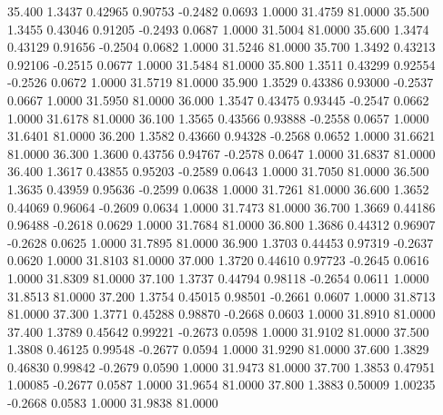   35.400   1.3437   0.42965   0.90753  -0.2482   0.0693   1.0000  31.4759  81.0000
  35.500   1.3455   0.43046   0.91205  -0.2493   0.0687   1.0000  31.5004  81.0000
  35.600   1.3474   0.43129   0.91656  -0.2504   0.0682   1.0000  31.5246  81.0000
  35.700   1.3492   0.43213   0.92106  -0.2515   0.0677   1.0000  31.5484  81.0000
  35.800   1.3511   0.43299   0.92554  -0.2526   0.0672   1.0000  31.5719  81.0000
  35.900   1.3529   0.43386   0.93000  -0.2537   0.0667   1.0000  31.5950  81.0000
  36.000   1.3547   0.43475   0.93445  -0.2547   0.0662   1.0000  31.6178  81.0000
  36.100   1.3565   0.43566   0.93888  -0.2558   0.0657   1.0000  31.6401  81.0000
  36.200   1.3582   0.43660   0.94328  -0.2568   0.0652   1.0000  31.6621  81.0000
  36.300   1.3600   0.43756   0.94767  -0.2578   0.0647   1.0000  31.6837  81.0000
  36.400   1.3617   0.43855   0.95203  -0.2589   0.0643   1.0000  31.7050  81.0000
  36.500   1.3635   0.43959   0.95636  -0.2599   0.0638   1.0000  31.7261  81.0000
  36.600   1.3652   0.44069   0.96064  -0.2609   0.0634   1.0000  31.7473  81.0000
  36.700   1.3669   0.44186   0.96488  -0.2618   0.0629   1.0000  31.7684  81.0000
  36.800   1.3686   0.44312   0.96907  -0.2628   0.0625   1.0000  31.7895  81.0000
  36.900   1.3703   0.44453   0.97319  -0.2637   0.0620   1.0000  31.8103  81.0000
  37.000   1.3720   0.44610   0.97723  -0.2645   0.0616   1.0000  31.8309  81.0000
  37.100   1.3737   0.44794   0.98118  -0.2654   0.0611   1.0000  31.8513  81.0000
  37.200   1.3754   0.45015   0.98501  -0.2661   0.0607   1.0000  31.8713  81.0000
  37.300   1.3771   0.45288   0.98870  -0.2668   0.0603   1.0000  31.8910  81.0000
  37.400   1.3789   0.45642   0.99221  -0.2673   0.0598   1.0000  31.9102  81.0000
  37.500   1.3808   0.46125   0.99548  -0.2677   0.0594   1.0000  31.9290  81.0000
  37.600   1.3829   0.46830   0.99842  -0.2679   0.0590   1.0000  31.9473  81.0000
  37.700   1.3853   0.47951   1.00085  -0.2677   0.0587   1.0000  31.9654  81.0000
  37.800   1.3883   0.50009   1.00235  -0.2668   0.0583   1.0000  31.9838  81.0000
